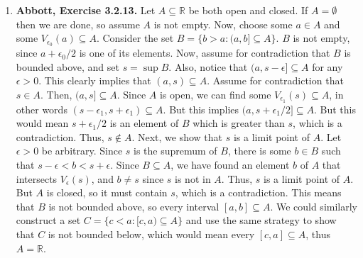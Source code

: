 \documentclass{article}
\newcommand{\R}{\mathbb{R}}
\newcommand{\set}[1]{\{#1\}}
\newcommand{\exc}[2][Abbott]{\item \textbf{#1, Exercise #2.}}
\newcommand{\lep}[1][L]{#1et $\epsilon > 0$ be arbitrary}
\begin{document}
\begin{enumerate}
    \exc{3.2.13}
    Let $A \subseteq \R$ be both open and closed. If $A = \emptyset$ then we are done, so assume $A$ is not empty. Now, choose some $a \in A$ and some $V_{\epsilon_0}(a) \subseteq A$. Consider the set $B = \set{b > a: (a, b] \subseteq A}$. $B$ is not empty, since $a + \epsilon_0/2$ is one of its elements. Now, assume for contradiction that $B$ is bounded above, and set $s = \sup{B}$. Also, notice that $(a, s-\epsilon] \subseteq A$ for any $\epsilon > 0$. This clearly implies that $(a, s) \subseteq A$. Assume for contradiction that $s \in A$. Then, $(a,s] \subseteq A$. Since $A$ is open, we can find some $V_{\epsilon_1}(s) \subseteq A$, in other words $(s-\epsilon_1, s+\epsilon_1) \subseteq A$. But this implies $(a,s+\epsilon_1/2] \subseteq A$. But this would mean $s+\epsilon_1/2$ is an element of $B$ which is greater than $s$, which is a contradiction. Thus, $s \notin A$. Next, we show that $s$ is a limit point of $A$. \lep. Since $s$ is the supremum of $B$, there is some $b \in B$ such that $s-\epsilon < b < s+\epsilon$. Since $B \subseteq A$, we have found an element $b$ of $A$ that intersects $V_\epsilon(s)$, and $b \neq s$ since $s$ is not in $A$. Thus, $s$ is a limit point of $A$. But $A$ is closed, so it must contain $s$, which is a contradiction. This means that $B$ is not bounded above, so every interval $[a, b] \subseteq A$. We could similarly construct a set 
    $C = \set{c < a : [c, a) \subseteq A}$ and use the same strategy to show that $C$ is not bounded below, which would mean every $[c, a] \subseteq A$, thus $A = \R$. 
\end{enumerate}
\end{document}
